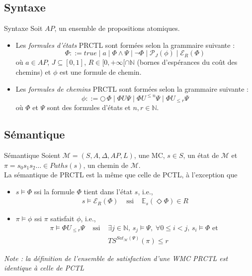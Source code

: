 \documentclass[compress]{beamer}
\begin{document}
\subsection{Syntaxe}
\begin{frame}{}
  \small
  \begin{block}{Syntaxe}
    Soit $AP$, un ensemble de propositions atomiques.
    \begin{itemize}
      \item Les \textit{\color{fibeamer@orange}formules d'états} PRCTL sont formées selon la
    grammaire suivante :
    \[
      \Phi ::= true \; | \; a \; | \; \Phi \wedge \Psi \; | \; \neg \Phi \; | \; \mathcal{P}_J(\phi) \; | \; \mathcal{E}_R (\Phi)
    \]
    où $a \in AP$, $J \subseteq [0, 1]$, $R \in [0, +\infty[ \cap \mathbb{N}$ (bornes d'espérances du coût des chemins) et $\phi$ est une formule de chemin.
      \item Les \textit{\color{fibeamer@orange}formules de chemins} PRCTL sont formées selon la grammaire suivante :
      \[
        \phi ::= \bigcirc\,\Phi \; | \; \Phi U \Psi \; | \; \Phi U^{\leq n} \Psi
        \; | \; \Phi U_{\leq r} \Psi
      \]
      où $\Phi$ et $\Psi$ sont des formules d'états et $n, r \in \mathbb{N}$.
    \end{itemize}
  \end{block}
\end{frame}

\subsection{Sémantique}
\begin{frame}{Sémantique}
\small
Soient $\mathcal{M} = (S, A, \Delta, AP, L)$, une MC, $s \in S$, un {\color{fibeamer@orange}état}
  de $\mathcal{M}$ et $\pi = s_0s_1s_2\dots \in Paths(s)$, un {\color{fibeamer@orange}chemin} de $\mathcal{M}$.\\
La sémantique de PRCTL est la même que celle de PCTL, à l'exception que
\begin{itemize}
  \item $s \models \Phi$ ssi la formule $\Phi$ tient dans l'état $s$, i.e.,
    \begin{align*}
      & s \models \mathcal{E}_R(\Phi) & \text{ ssi } & \mathbb{E}_s(\Diamond \Phi) \in R&
    \end{align*}
  \item $\pi \models \phi$ ssi $\pi$ satisfait $\phi$, i.e.,
  \begin{align*}
  &\pi \models \Phi U_{\leq r} \Psi &\text{ ssi }& \exists j \in \mathbb{N} ,\, s_j \models \Psi
    , \;  \forall 0 \leq i < j, \, s_i \models \Phi \text{ et }&\\
  & & & TS^{Sat_\mathcal{M}(\Psi)}(\pi) \leq r &
  \end{align*}
\end{itemize}
\textit{\color{gray}Note : la définition de l'ensemble de satisfaction d'une WMC PRCTL est identique à celle de PCTL}
\end{frame}
\end{document}
